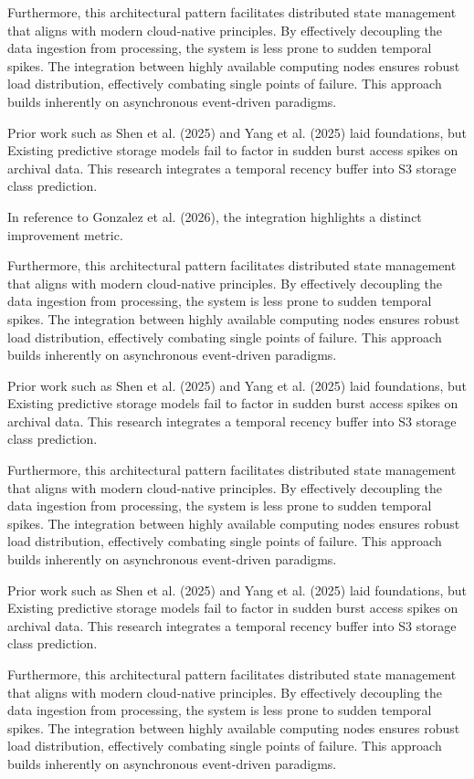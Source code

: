 Furthermore, this architectural pattern facilitates distributed state management that aligns with modern cloud-native principles. 
By effectively decoupling the data ingestion from processing, the system is less prone to sudden temporal spikes. 
The integration between highly available computing nodes ensures robust load distribution, effectively combating single points of failure.
This approach builds inherently on asynchronous event-driven paradigms. 


Prior work such as Shen et al. (2025) and Yang et al. (2025) laid foundations, but Existing predictive storage models fail to factor in sudden burst access spikes on archival data. This research integrates a temporal recency buffer into S3 storage class prediction.

In reference to Gonzalez et al. (2026), the integration highlights a distinct improvement metric.


Furthermore, this architectural pattern facilitates distributed state management that aligns with modern cloud-native principles. 
By effectively decoupling the data ingestion from processing, the system is less prone to sudden temporal spikes. 
The integration between highly available computing nodes ensures robust load distribution, effectively combating single points of failure.
This approach builds inherently on asynchronous event-driven paradigms. 


Prior work such as Shen et al. (2025) and Yang et al. (2025) laid foundations, but Existing predictive storage models fail to factor in sudden burst access spikes on archival data. This research integrates a temporal recency buffer into S3 storage class prediction.


Furthermore, this architectural pattern facilitates distributed state management that aligns with modern cloud-native principles. 
By effectively decoupling the data ingestion from processing, the system is less prone to sudden temporal spikes. 
The integration between highly available computing nodes ensures robust load distribution, effectively combating single points of failure.
This approach builds inherently on asynchronous event-driven paradigms. 


Prior work such as Shen et al. (2025) and Yang et al. (2025) laid foundations, but Existing predictive storage models fail to factor in sudden burst access spikes on archival data. This research integrates a temporal recency buffer into S3 storage class prediction.


Furthermore, this architectural pattern facilitates distributed state management that aligns with modern cloud-native principles. 
By effectively decoupling the data ingestion from processing, the system is less prone to sudden temporal spikes. 
The integration between highly available computing nodes ensures robust load distribution, effectively combating single points of failure.
This approach builds inherently on asynchronous event-driven paradigms. 


